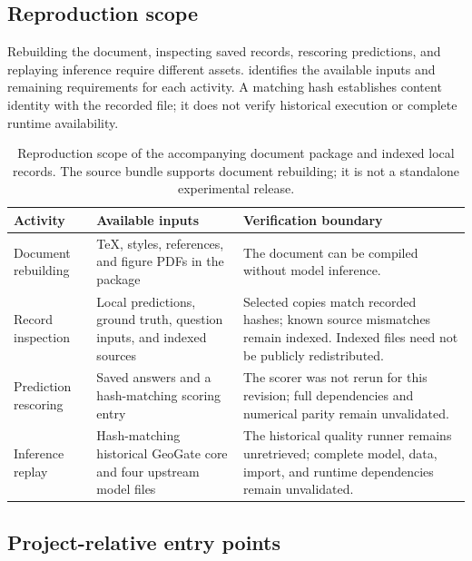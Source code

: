 \subsection{Reproduction scope}

Rebuilding the document, inspecting saved records, rescoring predictions, and replaying inference require different assets.  identifies the available inputs and remaining requirements for each activity. A matching hash establishes content identity with the recorded file; it does not verify historical execution or complete runtime availability.

\begin{table}[t]
\centering
\caption{Reproduction scope of the accompanying document package and indexed local records. The source bundle supports document rebuilding; it is not a standalone experimental release.}
\label{tab:supp_repro_scope}
\begin{tabular}{@{}>{\raggedright\arraybackslash}p{}>{\raggedright\arraybackslash}p{}>{\raggedright\arraybackslash}p{}@{}}
\toprule
Activity & Available inputs & Verification boundary \\
\midrule
Document rebuilding & TeX, styles, references, and figure PDFs in the package &
The document can be compiled without model inference. \\
Record inspection & Local predictions, ground truth, question inputs, and indexed sources &
Selected copies match recorded hashes; known source mismatches remain indexed.
Indexed files need not be publicly redistributed. \\
Prediction rescoring & Saved answers and a hash-matching scoring entry &
The scorer was not rerun for this revision; full dependencies and numerical parity remain unvalidated. \\
Inference replay & Hash-matching historical GeoGate core and four upstream model files &
The historical quality runner remains unretrieved; complete model, data, import, and runtime dependencies remain unvalidated. \\
\bottomrule
\end{tabular}
\end{table}

\subsection{Project-relative entry points}
\label{sec:supp_repro_index}

